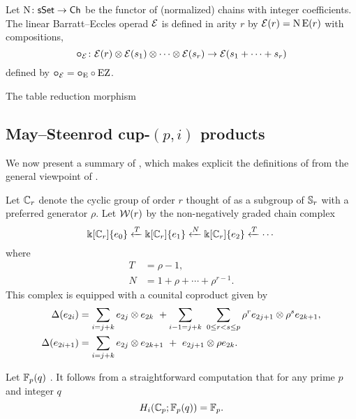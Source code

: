 \sssec

Let $\operatorname{N} \colon \mathsf{sSet} \to \mathsf{Ch}$ be the functor of (normalized) chains with integer coefficients.
The linear Barratt--Eccles operad $\mathcal{E}$ is defined in arity $r$ by $\mathcal{E}(r) = \operatorname{N}\operatorname{E}(r)$ with compositions,
\[
\bm{\circ}_{\mathcal{E}} \colon \mathcal{E}(r) \otimes \mathcal{E}(s_1) \otimes\dotsb\otimes \mathcal{E}(s_r) \to \mathcal{E}(s_1+\dots+s_r)
\]
defined by $\bm{\circ}_{\mathcal{E}} = \bm{\circ}_{\operatorname{E}} \circ \operatorname{EZ}$.

\sssec

The table reduction morphism \TBW

\subsection{May--Steenrod cup-$(p,i)$ products}

We now present a summary of \cite{medina2021may_st}, which makes explicit the definitions of \cite{steenrod1953cyclic} from the general viewpoint of \cite{may1970general}.

\sssec\label{sss:minimal resolution}

Let $\mathbb{C}_r$ denote the cyclic group of order $r$ thought of as a subgroup of $\mathbb{S}_r$ with a preferred generator $\rho$.
Let $\mathcal{W}(r)$ by the non-negatively graded chain complex
\begin{equation} \label{eq: minimal resolution}
	\Bbbk[\mathbb{C}_r]\{e_0\} \xleftarrow{T} \Bbbk[\mathbb{C}_r]\{e_1\} \xleftarrow{N} \Bbbk[\mathbb{C}_r]\{e_2\} \xleftarrow{T} \cdots
\end{equation}
where
\begin{equation} \label{eq: T and R definition}
	\begin{split}
		T &= \rho - 1, \\
		N &= 1 + \rho + \cdots + \rho^{r-1}.
	\end{split}
\end{equation}
This complex is equipped with a counital coproduct given by
\begin{align*}
	\Delta(e_{2i}) &=
	\sum_{i=j+k} e_{2j} \otimes e_{2k} \ + \sum_{i-1=j+k} \ \sum_{0 \leq r < s \leq p} \rho^r e_{2j+1} \otimes \rho^s e_{2k+1}, \\
	\Delta(e_{2i+1}) &=
	\sum_{i=j+k} e_{2j} \otimes e_{2k+1} \ +\ e_{2j+1} \otimes \rho e_{2k}.
\end{align*}

\sssec

Let ${\mathbb{F}_p}(q)$ \TBW.
It follows from a straightforward computation that for any prime $p$ and integer $q$
\begin{equation*}
	H_i(\mathbb{C}_p; {\mathbb{F}_p}(q)) = {\mathbb{F}_p}.
\end{equation*}

